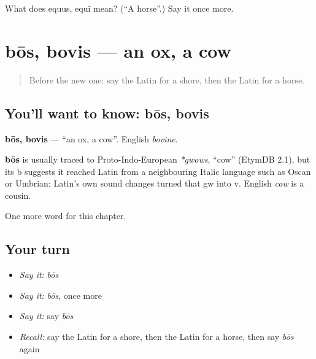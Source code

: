 \begin{tcolorbox}[breakable,colback=teal!4,colframe=teal!35!black,title={Before you move on}]
What does equus, equī mean? (\textquotedblleft{}A horse\textquotedblright{}.) Say it once more.
\end{tcolorbox}
\section[bōs, bovis]{bōs, bovis — an ox, a cow}

\label{lesson:LA-C90-bos}



\begin{quote}
Before the new one: say the Latin for a shore, then the Latin for a horse.
\end{quote}

\subsection*{You'll want to know: bōs, bovis}
\textbf{bōs, bovis} — \textquotedblleft{}an ox, a cow\textquotedblright{}. English \emph{bovine}.

\begin{cousinweb}
\textbf{bōs} is usually traced to Proto-Indo-European \emph{*gwows}, \textquotedblleft{}cow\textquotedblright{} (EtymDB 2.1), but its b suggests it reached Latin from a neighbouring Italic language such as Oscan or Umbrian: Latin's own sound changes turned that gw into v. English \emph{cow} is a cousin.
\end{cousinweb}

\begin{grammarlens}[title={What you've built}]
One more word for this chapter.
\end{grammarlens}

\subsection*{Your turn}
\begin{itemize}
\raggedright
  \item \emph{Say it:} \emph{bōs}
  \item \emph{Say it:} \emph{bōs}, once more
  \item \emph{Say it:} say \emph{bōs}
  \item \emph{Recall:} say the Latin for a shore, then the Latin for a horse, then say \emph{bōs} again
\end{itemize}

